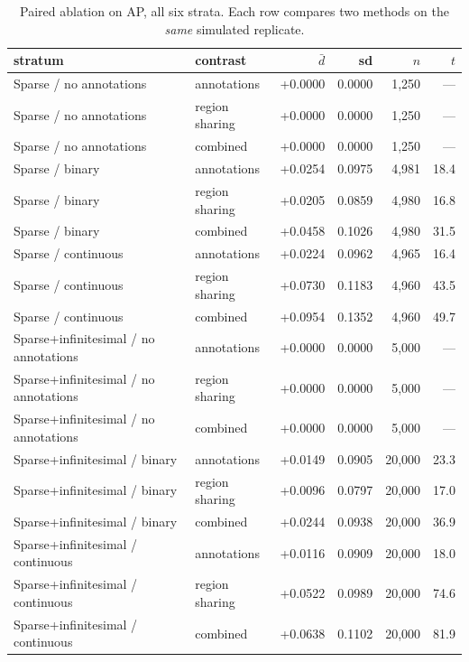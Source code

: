 \begin{table}[htbp]\centering\small
\caption{Paired ablation on AP, all six strata. Each row compares two methods on the \emph{same} simulated replicate.}\label{tab:ablation}
\begin{tabular}{llrrrr}\toprule
stratum & contrast & $\bar d$ & sd & $n$ & $t$\\\midrule
Sparse / no annotations & annotations & +0.0000 & 0.0000 & 1{,}250 & ---\\
Sparse / no annotations & region sharing & +0.0000 & 0.0000 & 1{,}250 & ---\\
Sparse / no annotations & combined & +0.0000 & 0.0000 & 1{,}250 & ---\\
Sparse / binary & annotations & +0.0254 & 0.0975 & 4{,}981 & 18.4\\
Sparse / binary & region sharing & +0.0205 & 0.0859 & 4{,}980 & 16.8\\
Sparse / binary & combined & +0.0458 & 0.1026 & 4{,}980 & 31.5\\
Sparse / continuous & annotations & +0.0224 & 0.0962 & 4{,}965 & 16.4\\
Sparse / continuous & region sharing & +0.0730 & 0.1183 & 4{,}960 & 43.5\\
Sparse / continuous & combined & +0.0954 & 0.1352 & 4{,}960 & 49.7\\
Sparse+infinitesimal / no annotations & annotations & +0.0000 & 0.0000 & 5{,}000 & ---\\
Sparse+infinitesimal / no annotations & region sharing & +0.0000 & 0.0000 & 5{,}000 & ---\\
Sparse+infinitesimal / no annotations & combined & +0.0000 & 0.0000 & 5{,}000 & ---\\
Sparse+infinitesimal / binary & annotations & +0.0149 & 0.0905 & 20{,}000 & 23.3\\
Sparse+infinitesimal / binary & region sharing & +0.0096 & 0.0797 & 20{,}000 & 17.0\\
Sparse+infinitesimal / binary & combined & +0.0244 & 0.0938 & 20{,}000 & 36.9\\
Sparse+infinitesimal / continuous & annotations & +0.0116 & 0.0909 & 20{,}000 & 18.0\\
Sparse+infinitesimal / continuous & region sharing & +0.0522 & 0.0989 & 20{,}000 & 74.6\\
Sparse+infinitesimal / continuous & combined & +0.0638 & 0.1102 & 20{,}000 & 81.9\\
\bottomrule\end{tabular}\end{table}
